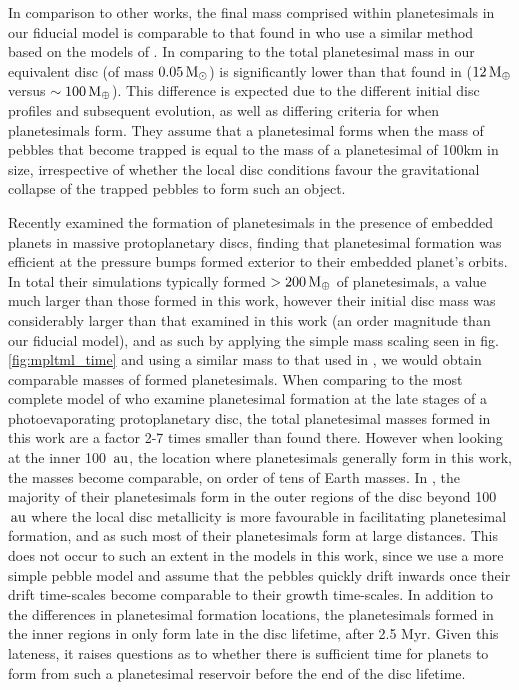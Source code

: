 \documentclass[a4paper,fleqn,usenatbib]{mnras}
\newcommand{\me}{{\, {\rm M}_{\oplus}}}
\newcommand{\msun}{{\, {\rm M}_{\odot}}}
\newcommand{\au}{{\, {\rm au}}}
\begin{document}
In comparison to other works, the final mass comprised within planetesimals in our fiducial model is comparable to that found in \citet{Voelkel20} who use a similar method based on the models of \citet{Lenz19}.
In comparing to \citet{Lenz19} the total planetesimal mass in our equivalent disc (of mass $0.05\msun$) is significantly lower than that found in \citet{Lenz19} ($12 \me$ versus $\sim100\me$).
This difference is expected due to the different initial disc profiles and subsequent evolution, as well as differing criteria for when planetesimals form.
They assume that a planetesimal forms when the mass of pebbles that become trapped is equal to the mass of a planetesimal of 100km in size, irrespective of whether the local disc conditions favour the gravitational collapse of the trapped pebbles to form such an object.

Recently \cite{Eriksson20} examined the formation of planetesimals in the presence of embedded planets in massive protoplanetary discs, finding that planetesimal formation was efficient at the pressure bumps formed exterior to their embedded planet's orbits.
In total their simulations typically formed $>200 \me$ of planetesimals, a value much larger than those formed in this work, however their initial disc mass was considerably larger than that examined in this work (an order magnitude than our fiducial model), and as such by applying the simple mass scaling seen in fig. \ref{fig:mpltml_time} and using a similar mass to that used in \citet{Eriksson20}, we would obtain comparable masses of formed planetesimals.
When comparing to the most complete model of \citet{Carrera17} who examine planetesimal formation at the late stages of a photoevaporating protoplanetary disc, the total planetesimal masses formed in this work are a factor 2-7 times smaller than found there.
However when looking at the inner 100 $\au$, the location where planetesimals generally form in this work, the masses become comparable, on order of tens of Earth masses.
In \citet{Carrera17}, the majority of their planetesimals form in the outer regions of the disc beyond 100 $\au$ where the local disc metallicity is more favourable in facilitating planetesimal formation, and as such most of their planetesimals form at large distances.
This does not occur to such an extent in the models in this work, since we use a more simple pebble model and assume that the pebbles quickly drift inwards once their drift time-scales become comparable to their growth time-scales.
In addition to the differences in planetesimal formation locations, the planetesimals formed in the inner regions in \citet{Carrera17} only form late in the disc lifetime, after 2.5 Myr.
Given this lateness, it raises questions as to whether there is sufficient time for planets to form from such a planetesimal reservoir before the end of the disc lifetime.
\end{document}

